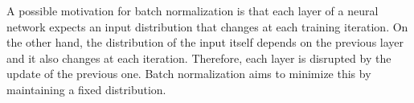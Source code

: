 \begin{description}
        \begin{remark}
            A possible motivation for batch normalization is that each layer of a neural network expects an input distribution that changes at each training iteration.
            On the other hand, the distribution of the input itself depends on the previous layer and it also changes at each iteration.
            Therefore, each layer is disrupted by the update of the previous one. Batch normalization aims to minimize this by maintaining a fixed distribution.
        \end{remark}
\end{description}